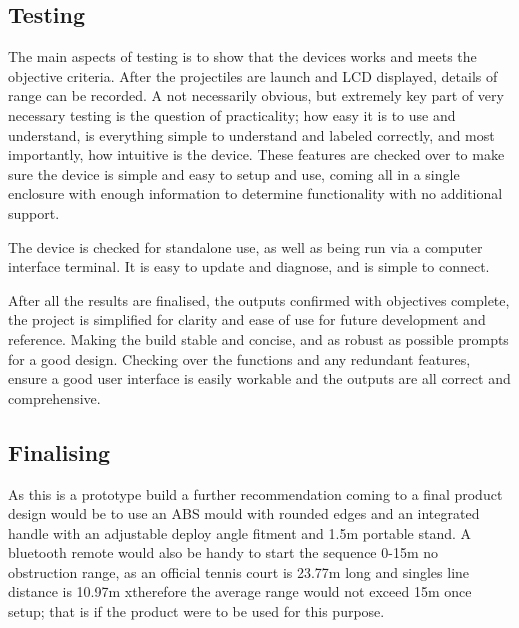 \documentclass[a4paper, 10pt]{IEEEconf}
\begin{document}

\subsection{Testing}

The main aspects of testing is to show that the devices works and meets the objective criteria. After the projectiles are launch and LCD displayed, details of range can be recorded. A not necessarily obvious, but extremely key part of very necessary testing is the question of practicality; how easy it is to use and understand, is everything simple to understand and labeled correctly, and most importantly, how intuitive is the device. These features are checked over to make sure the device is simple and easy to setup and use, coming all in a single enclosure with enough information to determine functionality with no additional support. 

The device is checked for standalone use, as well as being run via a computer interface terminal. It is easy to update and diagnose, and is simple to connect.

After all the results are finalised, the outputs confirmed with objectives complete, the project is simplified for clarity and ease of use for future development and reference. Making the build stable and concise, and as robust as possible prompts for a good design. Checking over the functions and any redundant features, ensure a good user interface is easily workable and the outputs are all correct and comprehensive.


\subsection{Finalising}

As this is a prototype build a further recommendation coming to a final product design would be to use an ABS mould with rounded edges and an integrated handle with an adjustable deploy angle fitment and 1.5m portable stand. A bluetooth remote would also be handy to start the sequence 0-15m no obstruction range, as an official tennis court is 23.77m long and singles line distance is 10.97m \cite{ball} xtherefore the average range would not exceed 15m once setup; that is if the product were to be used for this purpose.
\end{document}
